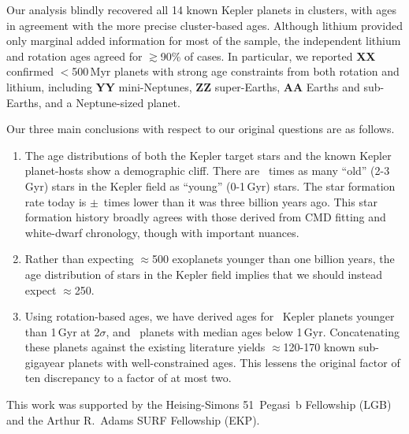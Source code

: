 \documentclass[11pt,twocolumn,tighten]{aastex63}
\begin{document}
Our analysis blindly recovered all 14 known Kepler planets in
clusters, with ages in agreement with the more precise cluster-based
ages.  Although lithium provided only marginal added information for
most of the sample, the independent lithium and rotation ages agreed
for $\gtrsim$90\% of cases.  In particular, we reported {\bf XX}
confirmed $<$500\,Myr planets with strong age constraints from both
rotation and lithium, including {\bf YY} mini-Neptunes, {\bf ZZ}
super-Earths, {\bf AA} Earths and sub-Earths, and a Neptune-sized
planet.

Our three main conclusions with respect to our original questions are
as follows.

\begin{enumerate}[leftmargin=*,topsep=0pt,itemsep=-1ex,partopsep=1ex,parsep=1ex]
  \item The age distributions of both the Kepler target stars and the
    known Kepler planet-hosts show a demographic cliff.  There are
    \ratioobtoybstars\ times as many ``old'' (2-3\,Gyr) stars in the
    Kepler field as ``young'' (0-1\,Gyr) stars.  The star formation
    rate today is \ratiosfr$\pm$\uncratiosfr\ times lower than it was
    three billion years ago.
    This star formation history broadly agrees with those derived
    from CMD fitting and white-dwarf chronology, though with
    important nuances.
  \item Rather than expecting $\approx$500 exoplanets younger than one
    billion years, the age distribution of stars in the
    Kepler field implies that we should instead expect $\approx$250.
  \item Using rotation-based ages, we have derived ages for
    \nplyounggyrotwosigma\ Kepler planets younger than 1\,Gyr at 2$\sigma$,
    and \nplyounggyro\ planets with median ages below 1\,Gyr.
    Concatenating these planets against the existing literature yields
    $\approx$120-170 known sub-gigayear planets with well-constrained
    ages.  This lessens the original factor of ten discrepancy to
    a factor of at most two.
\end{enumerate}


\acknowledgements
This work was supported by the Heising-Simons 51~Pegasi~b Fellowship
(LGB)
and the Arthur R.~Adams SURF Fellowship (EKP).

\end{document}
